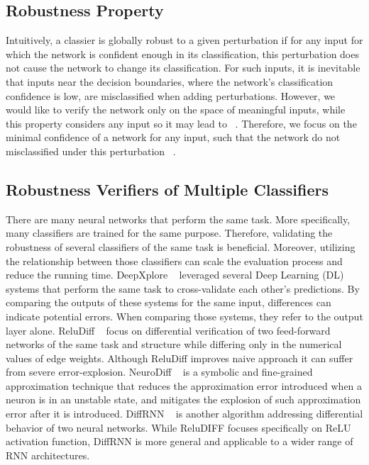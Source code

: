 \subsection{Robustness Property}
Intuitively, a classier is globally robust to a given perturbation if for any input for which the network is confident enough in its classification, this perturbation does not cause the network to change its classification. For such inputs, it is inevitable that inputs near the decision boundaries, where the network’s classification confidence is low, are misclassified when adding perturbations. However, we would like to verify the network only on the space of meaningful inputs, while this property considers any input so it may lead to ~\cite{Reluplex}. Therefore, we focus on the minimal confidence of a network for any input, such that the network do not misclassified under this perturbation ~\cite{VHAGAR}.
     
\subsection{Robustness Verifiers of Multiple Classifiers}
There are many neural networks that perform the same task. More specifically, many classifiers are trained for the same purpose. Therefore, validating the robustness of several classifiers of the same task is beneficial. Moreover, utilizing the relationship between those classifiers can scale the evaluation process and reduce the running time. DeepXplore ~\cite{DEEPXPLORE} leveraged several Deep Learning (DL) systems that perform the same task to cross-validate each other’s predictions. By comparing the outputs of these systems for the same input, differences can indicate potential errors. When comparing those systems, they refer to the output layer alone. ReluDiff ~\cite{RELUDIFF} focus on differential verification of two feed-forward networks of the same task and structure while differing only in the numerical values of edge weights. Although ReluDiff improves naive approach it can suffer from severe error-explosion.   NeuroDiff ~\cite{NEURODIFF} is a symbolic and fine-grained approximation technique that reduces the approximation error introduced when a neuron is in an unstable state, and mitigates the explosion of such approximation error after
it is introduced. DiffRNN ~\cite{DIFFRNN} is another algorithm addressing differential behavior of two neural networks. While ReluDIFF focuses specifically on ReLU activation function, DiffRNN is more general and applicable to a wider range of RNN architectures. 
